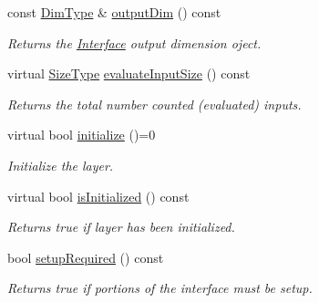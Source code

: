 \begin{DoxyCompactItemize}
const \hyperlink{classffnn_1_1layer_1_1internal_1_1_interface_a8d121d0103f254b51e48f7b20a17681f}{Dim\-Type} \& \hyperlink{classffnn_1_1layer_1_1internal_1_1_interface_aaa3e0e1735cbc17f9032573782f4e098}{output\-Dim} () const 
\begin{DoxyCompactList}\small\item\em Returns the \hyperlink{classffnn_1_1layer_1_1internal_1_1_interface}{Interface} output dimension oject. \end{DoxyCompactList}\item 
virtual \hyperlink{classffnn_1_1layer_1_1internal_1_1_interface_af0567642f60c65b5e87067226a54174b}{Size\-Type} \hyperlink{classffnn_1_1layer_1_1internal_1_1_interface_aae590ebe90408887805743c5e364dd45}{evaluate\-Input\-Size} () const 
\begin{DoxyCompactList}\small\item\em Returns the total number counted (evaluated) inputs. \end{DoxyCompactList}\item 
virtual bool \hyperlink{classffnn_1_1layer_1_1internal_1_1_interface_a4159d9d163a0bd5287cc02c91b5baba8}{initialize} ()=0
\begin{DoxyCompactList}\small\item\em Initialize the layer. \end{DoxyCompactList}\item 
virtual bool \hyperlink{classffnn_1_1layer_1_1internal_1_1_interface_a67cf9f89a90eadca6f9ec82dd66bd940}{is\-Initialized} () const 
\begin{DoxyCompactList}\small\item\em Returns true if layer has been initialized. \end{DoxyCompactList}\item 
bool \hyperlink{classffnn_1_1layer_1_1internal_1_1_interface_a6e7c83f8328e5c5f49fdba28abfba7c1}{setup\-Required} () const 
\begin{DoxyCompactList}\small\item\em Returns true if portions of the interface must be setup. \end{DoxyCompactList}\end{DoxyCompactItemize}
